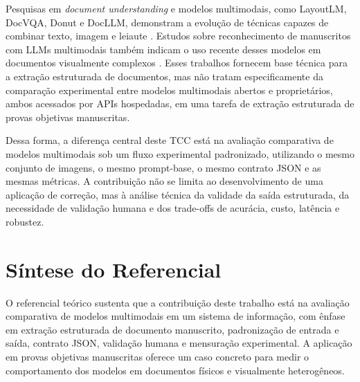 Pesquisas em \textit{document understanding} e modelos multimodais, como LayoutLM, DocVQA, Donut e DocLLM, demonstram a evolução de técnicas capazes de combinar texto, imagem e leiaute \cite{xu2020layoutlm,mathew2021docvqa,kim2022donut,docllm2024}. Estudos sobre reconhecimento de manuscritos com LLMs multimodais também indicam o uso recente desses modelos em documentos visualmente complexos \cite{li2024handwritingmllm}. Esses trabalhos fornecem base técnica para a extração estruturada de documentos, mas não tratam especificamente da comparação experimental entre modelos multimodais abertos e proprietários, ambos acessados por APIs hospedadas, em uma tarefa de extração estruturada de provas objetivas manuscritas.

Dessa forma, a diferença central deste TCC está na avaliação comparativa de modelos multimodais sob um fluxo experimental padronizado, utilizando o mesmo conjunto de imagens, o mesmo prompt-base, o mesmo contrato JSON e as mesmas métricas. A contribuição não se limita ao desenvolvimento de uma aplicação de correção, mas à análise técnica da validade da saída estruturada, da necessidade de validação humana e dos trade-offs de acurácia, custo, latência e robustez.

\section{Síntese do Referencial}

O referencial teórico sustenta que a contribuição deste trabalho está na avaliação comparativa de modelos multimodais em um sistema de informação, com ênfase em extração estruturada de documento manuscrito, padronização de entrada e saída, contrato JSON, validação humana e mensuração experimental. A aplicação em provas objetivas manuscritas oferece um caso concreto para medir o comportamento dos modelos em documentos físicos e visualmente heterogêneos.
